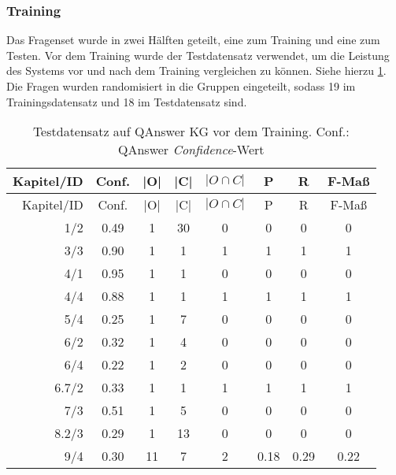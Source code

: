 \subsubsection{Training}

Das Fragenset wurde in zwei Hälften geteilt, eine zum Training und eine zum Testen.
Vor dem Training wurde der Testdatensatz verwendet, um die Leistung des Systems vor und nach dem Training vergleichen zu können.
Siehe hierzu \cref{tab:qanswervortraining}.
Die Fragen wurden randomisiert in die Gruppen eingeteilt, sodass 19 im Trainingsdatensatz und 18 im Testdatensatz sind.

\begin{longtable}{r c c c c c c c}
  \caption[Testdatensatz QAnswer vor Training]{Testdatensatz auf QAnswer KG vor dem Training.
  Conf.: QAnswer \emph{Confidence}-Wert}
  \label{tab:qanswervortraining}
  \\
  \toprule
  Kapitel/ID    & Conf. & |O|   & |C|   & $|O \cap C|$  & P     & R     & F-Maß   \\
  \midrule
  \endfirsthead
  \toprule
  Kapitel/ID    & Conf. & |O|   & |C|   & $|O \cap C|$  & P     & R     & F-Maß   \\
  \midrule
  \endhead
  1/2           & 0.49  & 1     & 30    & 0             & 0     & 0     & 0       \\
  3/3           & 0.90  & 1     & 1     & 1             & 1     & 1     & 1       \\
  4/1           & 0.95  & 1     & 1     & 0             & 0     & 0     & 0       \\
  4/4           & 0.88  & 1     & 1     & 1             & 1     & 1     & 1       \\
  5/4           & 0.25  & 1     & 7     & 0             & 0     & 0     & 0       \\
  6/2           & 0.32  & 1     & 4     & 0             & 0     & 0     & 0       \\
  6/4           & 0.22  & 1     & 2     & 0             & 0     & 0     & 0       \\
  6.7/2         & 0.33  & 1     & 1     & 1             & 1     & 1     & 1       \\
  7/3           & 0.51  & 1     & 5     & 0             & 0     & 0     & 0       \\
  8.2/3         & 0.29  & 1     & 13    & 0             & 0     & 0     & 0       \\
  9/4           & 0.30  & 11    & 7     & 2             & 0.18  & 0.29  & 0.22    \\

\end{longtable}
